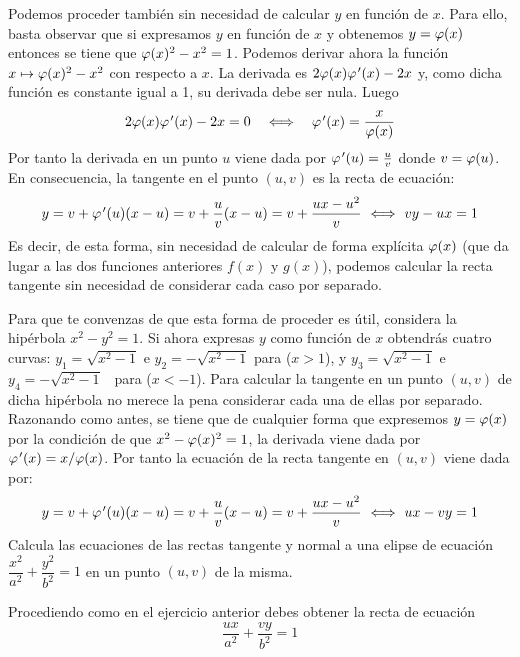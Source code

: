 \begin{ejercicios resueltos}
Podemos proceder también sin necesidad de calcular $y$ en función
de $x$. Para ello, basta observar que si expresamos $y$ en función
de $x$ y obtenemos $y=\varphi(x)$ entonces se tiene que $\varphi(x)^{2}-x^{2}=1$.
Podemos derivar ahora la función $x\mapsto\varphi(x)^{2}-x^{2}$ con respecto
a $x$. La derivada es $2\varphi(x)\varphi\mbox{$^{\mspace{2mu}\prime}$}(x)-2x$ y, como dicha función
es constante igual a 1, su derivada debe ser nula. Luego 
\[
2\varphi(x)\varphi\mbox{$^{\mspace{2mu}\prime}$}(x)-2x=0\quad\Longleftrightarrow\quad\varphi\mbox{$^{\mspace{2mu}\prime}$}(x)=\frac{x}{\varphi(x)}
\]
Por tanto la derivada en un punto $u$ viene dada por $\varphi\mbox{$^{\mspace{2mu}\prime}$}(u)=\frac{u}{v}$
donde $v=\varphi(u)$. En consecuencia, la tangente en el punto $(u,v)$
es la recta de ecuación: 
\[
y=v+\ff\tl(u)(x-u)=v+\frac{u}{v}(x-u)=v+\frac{ux-u^{2}}{v}\ \Longleftrightarrow\ vy-ux=1
\]
Es decir, de esta forma, sin necesidad de calcular de forma explícita
$\varphi(x)$ (que da lugar a las dos funciones anteriores $f(x)$ y $g(x)$),
podemos calcular la recta tangente sin necesidad de considerar cada
caso por separado.

Para que te convenzas de que esta forma de proceder es útil, considera
la hipérbola\linebreak{}
$x^{2}-y^{2}=1$. Si ahora expresas $y$ como función de $x$ obtendrás
cuatro curvas: \linebreak{}
$y_{1}=\sqrt{x^{2}-1}$ e $y_{2}=-\sqrt{x^{2}-1}$ para ($x>1$),
y $y_{3}=\sqrt{x^{2}-1}$ e %
\mbox{%
$y_{4}=-\sqrt{x^{2}-1}$%
} para ($x<-1$). Para calcular la tangente en un punto $(u,v)$ de
dicha hipérbola no merece la pena considerar cada una de ellas por
separado. Razonando como antes, se tiene que de cualquier forma que
expresemos $y=\varphi(x)$ por la condición de que $x^{2}-\varphi(x)^{2}=1$,
la derivada viene dada por $\varphi\mbox{$^{\mspace{2mu}\prime}$}(x)=x/\varphi(x)$. Por tanto la ecuación
de la recta tangente en $(u,v)$ viene dada por: 
\[
y=v+\ff\tl(u)(x-u)=v+\frac{u}{v}(x-u)=v+\frac{ux-u^{2}}{v}\ \Longleftrightarrow\ ux-vy=1
\]
\hecho \resuelto Calcula las ecuaciones de las rectas tangente y
normal a una elipse de ecuación $\dfrac{x^{2}}{a^{2}}+\dfrac{y^{2}}{b^{2}}=1$
en un punto $(u,v)$ de la misma.

\sol Procediendo como en el ejercicio anterior debes obtener la recta
de ecuación 
\[
\frac{ux}{a^{2}}+\frac{vy}{b^{2}}=1
\]
\hecho \end{ejercicios resueltos} 
